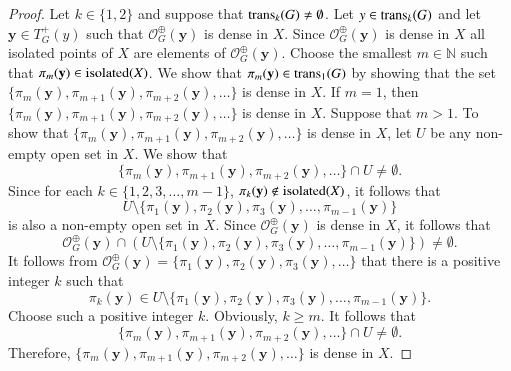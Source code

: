 \documentclass[a4paper,12pt]{article} %
\newcommand{\isolated}{\textup{isolated}}
\newcommand{\trans}{\textup{trans}}
\begin{document}
	\begin{proof}
		Let $k \in \{1,2\}$ and  suppose that  $\trans_k (G) \neq \emptyset$. Let $y \in \trans_k(G)$ and let $\mathbf y \in T_G^+(y)$ such that $\mathcal O_G^{\oplus}(\mathbf y) $ is dense in $X$. Since $\mathcal O_G^{\oplus}(\mathbf y) $ is dense in $X$ all isolated points of $X$ are elements of $\mathcal O_G^{\oplus}(\mathbf y) $. Choose the  smallest $m \in \mathbb N$ such that $\pi_m (\mathbf y )\in \isolated(X)$.  We show that $\pi_m(\mathbf y)\in \trans_1(G)$ by showing that the set $\{ \pi_m (\mathbf y ), \pi_{m+1} (\mathbf y ), \pi_{m+2} (\mathbf y ), \ldots\}$ is dense in $X$.   If $m=1$, then  $\{ \pi_m (\mathbf y ), \pi_{m+1} (\mathbf y ), \pi_{m+2} (\mathbf y ), \ldots\}$ is dense in $X$.  Suppose that $m>1$.  To show that $\{ \pi_m (\mathbf y ), \pi_{m+1} (\mathbf y ), \pi_{m+2} (\mathbf y ), \ldots\}$ is dense in $X$,  let $U$ be any non-empty open set in $X$.  We show that 
		$$
		\{ \pi_m (\mathbf y ), \pi_{m+1} (\mathbf y ), \pi_{m+2} (\mathbf y ), \ldots\}\cap U\neq \emptyset.
		$$
	Since for each $k\in \{1,2,3,\ldots ,m-1\}$, $\pi_k(\mathbf y)\not \in \isolated(X)$, it follows that 
	$$
	U\setminus\{\pi_1(\mathbf y),\pi_2(\mathbf y),\pi_3(\mathbf y),\ldots ,\pi_{m-1}(\mathbf y)\}
	$$	
	is also a non-empty open set in $X$.  Since $\mathcal O_G^{\oplus}(\mathbf y) $ is dense in $X$, it follows that 
	$$
	\mathcal O_G^{\oplus}(\mathbf y)\cap (U\setminus\{\pi_1(\mathbf y),\pi_2(\mathbf y),\pi_3(\mathbf y),\ldots ,\pi_{m-1}(\mathbf y)\})\neq \emptyset.
	$$ 
It follows from $\mathcal O_G^{\oplus}(\mathbf y)=\{\pi_1(\mathbf y),\pi_2(\mathbf y),\pi_3(\mathbf y),\ldots\}$  that  there is a positive integer $k$ such that 
$$
\pi_k(\mathbf y)\in U\setminus\{\pi_1(\mathbf y),\pi_2(\mathbf y),\pi_3(\mathbf y),\ldots ,\pi_{m-1}(\mathbf y)\}.
$$
Choose such a positive integer $k$. Obviously, $k\geq m$.	It follows that 
$$
		\{ \pi_m (\mathbf y ), \pi_{m+1} (\mathbf y ), \pi_{m+2} (\mathbf y ), \ldots\}\cap U\neq \emptyset.
		$$
Therefore,  	$\{ \pi_m (\mathbf y ), \pi_{m+1} (\mathbf y ), \pi_{m+2} (\mathbf y ), \ldots\}$ is dense in $X$.  


\end{proof}
\end{document}
